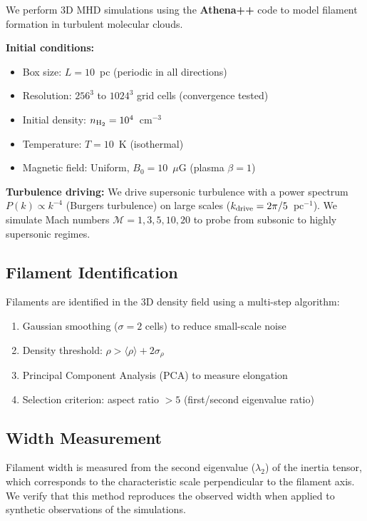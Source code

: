\documentclass{mnras}
\begin{document}
We perform 3D MHD simulations using the \textbf{Athena++} code \citep{Stone2008} to model filament formation in turbulent molecular clouds.

\textbf{Initial conditions:}
\begin{itemize}
  \item Box size: $L = 10$~pc (periodic in all directions)
  \item Resolution: $256^3$ to $1024^3$ grid cells (convergence tested)
  \item Initial density: $n_{\rm H_2} = 10^4$~cm$^{-3}$
  \item Temperature: $T = 10$~K (isothermal)
  \item Magnetic field: Uniform, $B_0 = 10$~$\mu$G (plasma $\beta = 1$)
\end{itemize}

\textbf{Turbulence driving:} We drive supersonic turbulence with a power spectrum $P(k) \propto k^{-4}$ (Burgers turbulence) on large scales ($k_{\rm drive} = 2\pi / 5$~pc$^{-1}$). We simulate Mach numbers $\mathcal{M} = 1, 3, 5, 10, 20$ to probe from subsonic to highly supersonic regimes.

\subsection{Filament Identification}

Filaments are identified in the 3D density field using a multi-step algorithm:
\begin{enumerate}
  \item Gaussian smoothing ($\sigma = 2$ cells) to reduce small-scale noise
  \item Density threshold: $\rho > \langle \rho \rangle + 2\sigma_\rho$
  \item Principal Component Analysis (PCA) to measure elongation
  \item Selection criterion: aspect ratio $>5$ (first/second eigenvalue ratio)
\end{enumerate}

\subsection{Width Measurement}

Filament width is measured from the second eigenvalue ($\lambda_2$) of the inertia tensor, which corresponds to the characteristic scale perpendicular to the filament axis. We verify that this method reproduces the observed width when applied to synthetic observations of the simulations.
\end{document}
